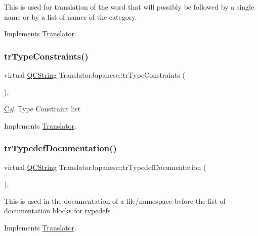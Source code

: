 This is used for translation of the word that will possibly be followed by a single name or by a list of names of the category. 

Implements \mbox{\hyperlink{class_translator}{Translator}}.

\mbox{\label{class_translator_japanese_ab939c0522440d2a44474efb3594e4b29}} 
\subsubsection{\texorpdfstring{trTypeConstraints()}{trTypeConstraints()}}
{\footnotesize\ttfamily virtual \mbox{\hyperlink{class_q_c_string}{Q\+C\+String}} Translator\+Japanese\+::tr\+Type\+Constraints (\begin{DoxyParamCaption}{ }\end{DoxyParamCaption})\hspace{0.3cm}{\ttfamily [inline]}, {\ttfamily [virtual]}}

\mbox{\hyperlink{class_c}{C}}\# Type Constraint list 

Implements \mbox{\hyperlink{class_translator}{Translator}}.

\mbox{\label{class_translator_japanese_a5072f93dfba54ab434b7a22472bcee9a}} 
\subsubsection{\texorpdfstring{trTypedefDocumentation()}{trTypedefDocumentation()}}
{\footnotesize\ttfamily virtual \mbox{\hyperlink{class_q_c_string}{Q\+C\+String}} Translator\+Japanese\+::tr\+Typedef\+Documentation (\begin{DoxyParamCaption}{ }\end{DoxyParamCaption})\hspace{0.3cm}{\ttfamily [inline]}, {\ttfamily [virtual]}}

This is used in the documentation of a file/namespace before the list of documentation blocks for typedefs 

Implements \mbox{\hyperlink{class_translator}{Translator}}.


